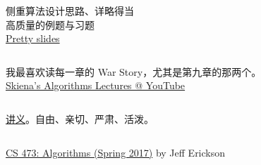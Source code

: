 \begin{frame}{}
  \begin{columns}
  \end{columns}

  \vspace{0.10cm}
  \begin{center}
    侧重算法设计思路、详略得当 \\[6pt]
    高质量的例题与习题 \\[10pt]

    \href{http://www.cs.princeton.edu/~wayne/kleinberg-tardos/}{Pretty slides}
  \end{center}
\end{frame}

\begin{frame}{}
  \begin{columns}
  \end{columns}

  \vspace{0.50cm}
  \begin{center}
    我最喜欢读每一章的 War Story，尤其是第九章的那两个。\\[10pt]

    \href{https://www.youtube.com/playlist?list=PLOtl7M3yp-DX32N0fVIyvn7ipWKNGmwpp}{Skiena's Algorithms Lectures @ YouTube}
  \end{center}
\end{frame}

\begin{frame}{}
  \begin{columns}
      \vspace{-0.30cm}
      {\centerline{\href{http://jeffe.cs.illinois.edu/teaching/algorithms/all-algorithms.pdf}{讲义}。自由、亲切、严肃、活泼。}}
  \end{columns}

  \vspace{0.30cm}
  \begin{center}
    \href{https://recordings.engineering.illinois.edu:8443/ess/portal/section/d6d800b7-eb5c-4420-8175-10becaf2d25d}{CS 473: Algorithms (Spring 2017)} by Jeff Erickson
  \end{center}
\end{frame}

